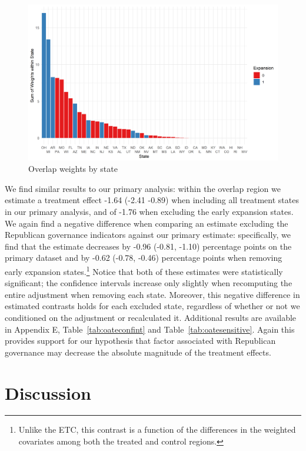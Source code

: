 \documentclass[12pt]{article}
\begin{document}
\begin{figure}[]
\begin{center}
    \includegraphics[scale=0.6]{01_Plots/oate-region-c1-a.png}
    \caption{Overlap weights by state}
    \label{oatearea}
\end{center}
\end{figure}

We find similar results to our primary analysis: within the overlap region we estimate a treatment effect -1.64 (-2.41 -0.89) when including all treatment states in our primary analysis, and of -1.76 when excluding the early expansion states. We again find a negative difference when comparing an estimate excluding the Republican governance indicators against our primary estimate: specifically, we find that the estimate decreases by -0.96 (-0.81, -1.10) percentage points on the primary dataset and by -0.62 (-0.78, -0.46) percentage points when removing early expansion states.\footnote{Unlike the ETC, this contrast is a function of the differences in the weighted covariates among both the treated and control regions.} Notice that both of these estimates were statistically significant; the confidence intervals increase only slightly when recomputing the entire adjustment when removing each state. Moreover, this negative difference in estimated contrasts holds for each excluded state, regardless of whether or not we conditioned on the adjustment or recalculated it. Additional results are available in Appendix E, Table~\ref{tab:oateconfint} and Table~\ref{tab:oatesensitive}. Again this provides support for our hypothesis that factor associated with Republican governance may decrease the absolute magnitude of the treatment effects.

\section{Discussion}
\end{document}
